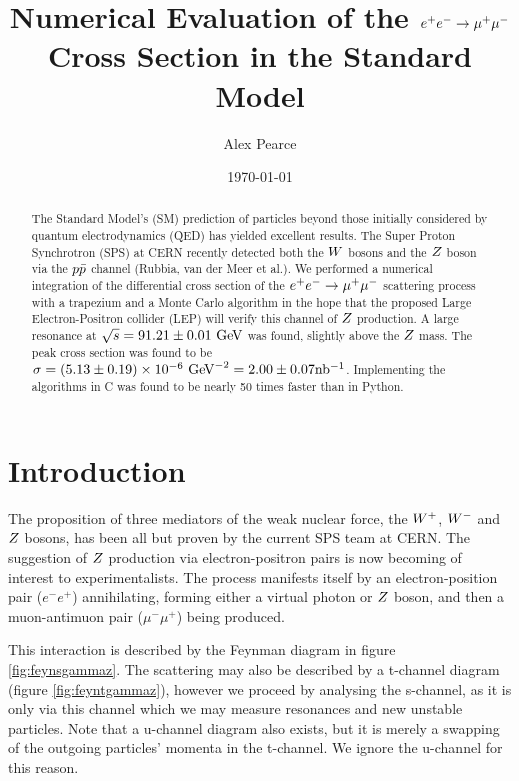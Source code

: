 \documentclass[]{article}
\providecommand{\e}[1]{\ensuremath{\times 10^{#1}}}
\begin{document}
\title{Numerical Evaluation of the $e^+ e^-  \rightarrow \mathrm{\mu^+ \mu^-} $ Cross Section in the Standard Model}
\author{Alex Pearce}
\date{\today}
\maketitle


\begin{abstract}
The Standard Model's (SM) prediction of particles beyond those initially considered by quantum electrodynamics (QED) has yielded excellent results. The Super Proton Synchrotron (SPS) at CERN recently detected both the $W $ bosons and the $Z $ boson via the $p\bar{p}$ channel (Rubbia, van der Meer et al.). We performed a numerical integration of the differential cross section of the $e^+ e^-  \rightarrow \mathrm{\mu^+ \mu^-} $ scattering process with a trapezium and a Monte Carlo algorithm in the hope that the proposed Large Electron-Positron collider (LEP) will verify this channel of $Z $ production. A large resonance at $\sqrt{s}=91.21\pm0.01\GeV$ was found, slightly above the $Z $ mass. The peak cross section was found to be $\sigma=(5.13\pm0.19)\e{-6}\GeV^{-2}=2.00\pm0.07\inb$. Implementing the algorithms in C was found to be nearly 50 times faster than in Python.
\end{abstract}


\section{Introduction}\label{sec:intro}

The proposition of three mediators of the weak nuclear force, the $W^+ $, $W^- $ and $Z $ bosons, has been all but proven by the current SPS team at CERN. The suggestion of $Z $ production via electron-positron pairs is now becoming of interest to experimentalists. The process manifests itself by an electron-position pair ($e^{-}e^{+}$) annihilating, forming either a virtual photon or $Z $ boson, and then a muon-antimuon pair ($\mu^{-}\mu^{+}$) being produced.

This interaction is described by the Feynman diagram in figure \ref{fig:feynsgammaz}. The scattering may also be described by a t-channel diagram (figure \ref{fig:feyntgammaz}), however we proceed by analysing the s-channel, as it is only via this channel which we may measure resonances and new unstable particles. Note that a u-channel diagram also exists, but it is merely a swapping of the outgoing particles' momenta in the t-channel. We ignore the u-channel for this reason.
\end{document}
